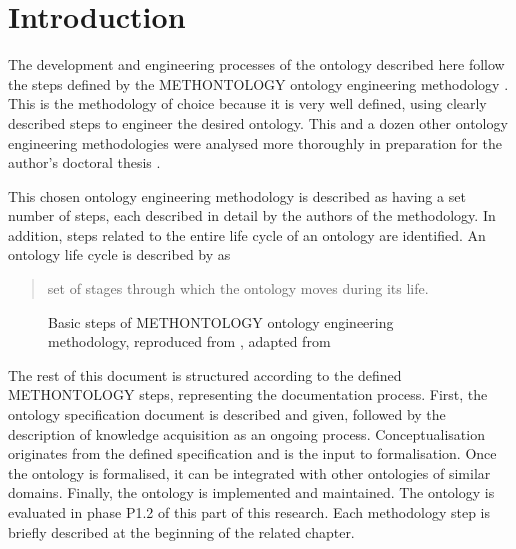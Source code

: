 \chapter*{Introduction}

The development and engineering processes of the ontology described here follow the steps defined by the METHONTOLOGY ontology engineering methodology \cite{fernandez-lopez1997METHONTOLOGYOntologicalArt, okresaduric2019OrganizationalModelingLargeScale}. This is the methodology of choice because it is very well defined, using clearly described steps to engineer the desired ontology. This and a dozen other ontology engineering methodologies were analysed more thoroughly in preparation for the author's doctoral thesis \cite{okresaduric2019OrganizationalModelingLargeScale}.

This chosen ontology engineering methodology is described as having a set number of steps,%
each described in detail by the authors of the methodology. In addition, steps related to the entire life cycle of an ontology are identified. An ontology life cycle is described by \citeauthor{iqbal2013AnalysisOntologyEngineering} as \blockquote[{\cite[p. 2997]{iqbal2013AnalysisOntologyEngineering}}]{ set of stages through which the ontology moves during its life.} 

\begin{figure}
    \resizebox{\linewidth}{!}{}
    \caption{Basic steps of METHONTOLOGY ontology engineering methodology, reproduced from \cite{okresaduric2019OrganizationalModelingLargeScale}, adapted from \cite{fernandez-lopez1997METHONTOLOGYOntologicalArt}}
    \label{fig:methontology steps}
\end{figure}

The rest of this document is structured according to the defined METHONTOLOGY steps, representing the documentation process. First, the ontology specification%
document is described and given, followed by the description of knowledge acquisition%
as an ongoing process.
Conceptualisation%
originates from the defined specification and is the input to formalisation.%
Once the ontology is formalised, it can be integrated%
with other ontologies of similar domains. Finally, the ontology is implemented and maintained.%
The ontology is evaluated in phase P1.2 of this part of this research.%
Each methodology step is briefly described at the beginning of the related chapter.
